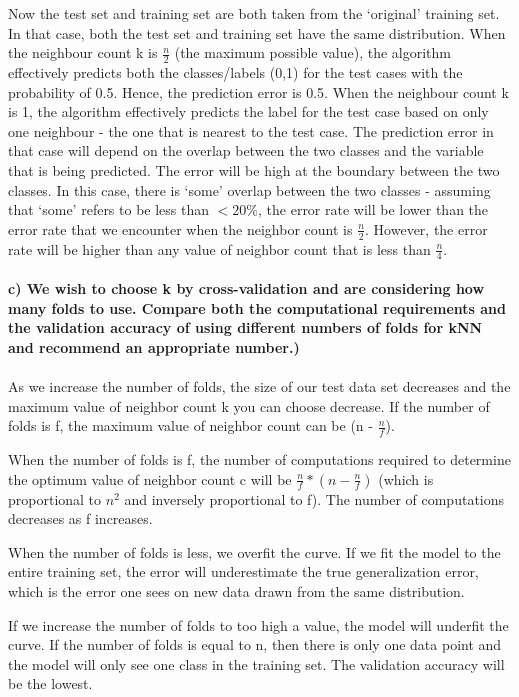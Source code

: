 \documentclass[11pt,letterpaper]{article}
\begin{document}
Now the test set and training set are both taken from the ‘original’ training set. In that case, both the test set and training set have the same distribution.  
When the neighbour count k is $\frac{n}{2}$ (the maximum possible value), the algorithm effectively predicts both the classes/labels (0,1) for the test cases with the probability of 0.5. Hence, the prediction error is 0.5.
When the neighbour count k is 1, the algorithm effectively predicts the label for the test case based on only one neighbour - the one that is nearest to the test case. The prediction error in that case will depend on the overlap between the two classes and the variable that is being predicted. The error will be high at the boundary between the two classes. In this case, there is ‘some’ overlap between the two classes -  assuming that ‘some’ refers to be less than $<20\%$, the error rate will be lower than the error rate that we encounter when the neighbor count is $\frac{n}{2}$.
However, the error rate will be higher than any value of neighbor count that is less than $\frac{n}{4}$.\\\\

\textbf{c) We wish to choose k by cross-validation and are considering how many folds to use. Compare both the computational requirements and the validation accuracy of using different numbers of folds for kNN and recommend an appropriate number.)}\\\\
As we increase the number of folds, the size of our test data set decreases  and the maximum value of neighbor count  k you can choose decrease.  If the number of folds is f, the maximum value of neighbor count can be (n - $\frac{n}{f}$).

When the number of folds is f, the number of computations required to determine the optimum value of neighbor count c will be  $\frac{n}{f}*(n-\frac{n}{f})$ (which is proportional to $n^2$ and inversely proportional to f). The number of computations decreases as f increases.

When the number of folds is less, we overfit the curve. If we fit the model to the entire training set, the error will underestimate the true generalization error, which is the error one sees on new data drawn from the same distribution. 

If we increase the number of folds to too high a value, the model will underfit the curve. If the number of folds is equal to n, then there is only one data point and the model will only see one class in the training set. The validation accuracy will be the lowest.
\end{document}

